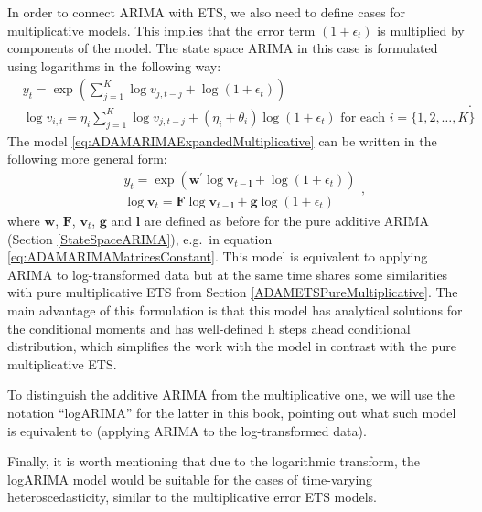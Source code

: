 \documentclass[]{book}
\theoremstyle{definition}
\theoremstyle{definition}
\theoremstyle{definition}
\theoremstyle{definition}
\theoremstyle{remark}
\begin{document}
In order to connect ARIMA with ETS, we also need to define cases for multiplicative models. This implies that the error term \((1+\epsilon_t)\) is multiplied by components of the model. The state space ARIMA in this case is formulated using logarithms in the following way:
\begin{equation}
  \begin{aligned}
    &{y}_{t} = \exp \left( \sum_{j=1}^K \log v_{j,t-j} + \log(1+\epsilon_t) \right) \\
    &\log v_{i,t} = \eta_i \sum_{j=1}^K \log v_{j,t-j} + (\eta_i + \theta_i) \log(1+\epsilon_t) \text{ for each } i=\{1, 2, \dots, K \}
  \end{aligned}.
  \label{eq:ADAMARIMAExpandedMultiplicative}
\end{equation}
The model \eqref{eq:ADAMARIMAExpandedMultiplicative} can be written in the following more general form:
\begin{equation}
  \begin{aligned}
    &{y}_{t} = \exp \left( \mathbf{w}^\prime \log \mathbf{v}_{t-\mathbf{l}} + \log(1+\epsilon_t) \right) \\
    &\log \mathbf{v}_{t} = \mathbf{F} \log \mathbf{v}_{t-\mathbf{l}} + \mathbf{g} \log(1+\epsilon_t)
  \end{aligned},
  \label{eq:ADAMStateSpaceMultiplicative}
\end{equation}
where \(\mathbf{w}\), \(\mathbf{F}\), \(\mathbf{v}_t\), \(\mathbf{g}\) and \(\mathbf{l}\) are defined as before for the pure additive ARIMA (Section \ref{StateSpaceARIMA}), e.g.~in equation \eqref{eq:ADAMARIMAMatricesConstant}. This model is equivalent to applying ARIMA to log-transformed data but at the same time shares some similarities with pure multiplicative ETS from Section \ref{ADAMETSPureMultiplicative}. The main advantage of this formulation is that this model has analytical solutions for the conditional moments and has well-defined h steps ahead conditional distribution, which simplifies the work with the model in contrast with the pure multiplicative ETS.

To distinguish the additive ARIMA from the multiplicative one, we will use the notation ``logARIMA'' for the latter in this book, pointing out what such model is equivalent to (applying ARIMA to the log-transformed data).

Finally, it is worth mentioning that due to the logarithmic transform, the logARIMA model would be suitable for the cases of time-varying heteroscedasticity, similar to the multiplicative error ETS models.
\end{document}
